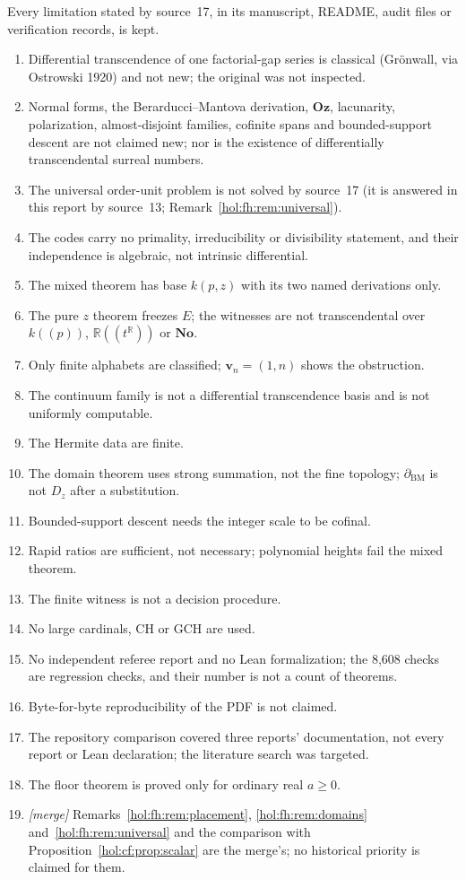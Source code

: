 \documentclass[11pt]{article}
\numberwithin{equation}{section}
\theoremstyle{definition}
\theoremstyle{remark}
\newcommand{\R}{\mathbb R}
\newcommand{\No}{\mathbf{No}}
\newcommand{\Oz}{\mathbf{Oz}}
\begin{document}
Every limitation stated by source~17, in its manuscript, README, audit files or
verification records, is kept.
\begin{enumerate}[label=\textup{(F\arabic*)}]
\item Differential transcendence of one factorial-gap series is classical
(Gr\"onwall, via Ostrowski 1920) and not new; the original was not inspected.
\item Normal forms, the Berarducci--Mantova derivation, $\Oz$, lacunarity,
polarization, almost-disjoint families, cofinite spans and bounded-support
descent are not claimed new; nor is the existence of differentially
transcendental surreal numbers.
\item The universal order-unit problem is not solved by source~17 (it is
answered in this report by source~13; Remark~\ref{hol:fh:rem:universal}).
\item The codes carry no primality, irreducibility or divisibility statement,
and their independence is algebraic, not intrinsic differential.
\item The mixed theorem has base $k(p,z)$ with its two named derivations only.
\item The pure $z$ theorem freezes $E$; the witnesses are not transcendental over
$k((p))$, $\R((t^\R))$ or $\No$.
\item Only finite alphabets are classified; $\mathbf v_n=(1,n)$ shows the
obstruction.
\item The continuum family is not a differential transcendence basis and is not
uniformly computable.
\item The Hermite data are finite.
\item The domain theorem uses strong summation, not the fine topology;
$\partial_{\mathrm{BM}}$ is not $D_z$ after a substitution.
\item Bounded-support descent needs the integer scale to be cofinal.
\item Rapid ratios are sufficient, not necessary; polynomial heights fail the
mixed theorem.
\item The finite witness is not a decision procedure.
\item No large cardinals, CH or GCH are used.
\item No independent referee report and no Lean formalization; the 8{,}608
checks are regression checks, and their number is not a count of theorems.
\item Byte-for-byte reproducibility of the PDF is not claimed.
\item The repository comparison covered three reports' documentation, not every
report or Lean declaration; the literature search was targeted.
\item The floor theorem is proved only for ordinary real $a\ge0$.
\item \emph{[merge]} Remarks~\ref{hol:fh:rem:placement},
\ref{hol:fh:rem:domains} and~\ref{hol:fh:rem:universal} and the comparison with
Proposition~\ref{hol:cf:prop:scalar} are the merge's; no historical priority is
claimed for them.
\end{enumerate}
\end{document}
